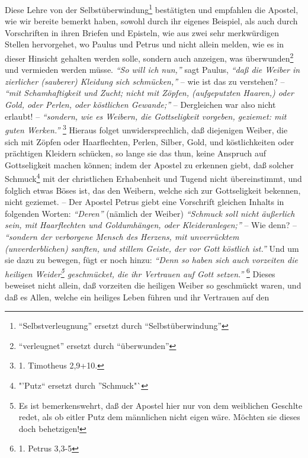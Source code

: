 Diese Lehre von der Selbstüberwindung\footnote{"`Selbstverleugnung"' ersetzt durch "`Selbstüberwindung"'} bestätigten und empfahlen die Apostel, wie
wir bereite bemerkt haben, sowohl durch ihr eigenes Beispiel, als auch durch
Vorschriften in ihren Briefen und Episteln, wie aus zwei sehr merkwürdigen
Stellen hervorgehet, wo Paulus und Petrus und nicht allein melden, wie es in
dieser Hinsicht gehalten werden solle, sondern auch anzeigen, was überwunden\footnote{"`verleugnet"' ersetzt durch "`überwunden"'} und
vermieden werden müsse. \textit{"`So will ich nun,"'} sagt Paulus,
\textit{"`daß die Weiber in
zierlicher (sauberer) Kleidung sich schmücken,"'} -- wie ist das zu verstehen? --
\textit{"`mit Schamhaftigkeit und Zucht; nicht mit Zöpfen, (aufgeputzten Haaren,) oder
Gold, oder Perlen, oder köstlichen Gewande;"'} -- Dergleichen war also nicht
erlaubt! -- \textit{"`sondern, wie es Weibern, die Gottseligkeit vorgeben, geziemet: mit
guten Werken."'}
\footnote{1. Timotheus 2,9+10.}
Hieraus folget unwidersprechlich, daß
diejenigen Weiber, die sich mit Zöpfen oder Haarflechten, Perlen, Silber, Gold,
und köstlichkeiten oder prächtigen Kleidern schücken, so lange sie das thun,
keine Anspruch auf Gottseligkeit machen können; indem der Apostel zu erkennen
giebt, daß solcher Schmuck\footnote{"'Putz"` ersetzt durch "'Schmuck"`} mit der christlichen Erhabenheit und Tugend nicht
übereinstimmt, und folglich etwas Böses ist, das den Weibern, welche sich zur
Gottseligkeit bekennen, nicht geziemet. -- Der Apostel Petrus giebt eine
Vorschrift gleichen Inhalts in folgenden Worten: \textit{"`Deren"'} (nämlich der Weiber)
\textit{"`Schmuck soll nicht äußerlich sein, mit Haarflechten und Goldumhängen, oder
Kleideranlegen;"'} -- Wie denn? --
\textit{"`sondern der verborgene Mensch des Herzens,
mit unverrücktem (unverderblichen) sanften, und stillem Geiste, der vor Gott
köstlich ist."'} Und um sie dazu zu bewegen, fügt er noch hinzu:
\textit{"`Denn so haben
sich auch vorzeiten die heiligen Weider\footnote{Es ist bemerkenswehrt, daß der
Apostel hier nur von dem weiblichen Geschlte redet, als ob eitler Putz dem
männlichen nicht eigen wäre. Möchten sie dieses doch behetzigen!} geschmücket,
die ihr Vertrauen auf Gott setzen."'}
\footnote{1. Petrus 3,3-5}
Dieses
beweiset nicht allein, daß vorzeiten die heiligen Weiber so geschmückt waren,
und daß es Allen, welche ein heiliges Leben führen und ihr Vertrauen auf den
